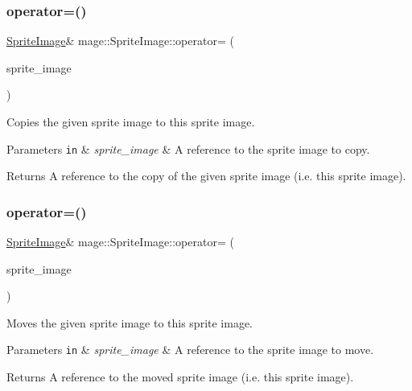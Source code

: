 \subsubsection{\texorpdfstring{operator=()}{operator=()}\hspace{0.1cm}{\footnotesize\ttfamily [1/2]}}
{\footnotesize\ttfamily \hyperlink{classmage_1_1_sprite_image}{Sprite\+Image}\& mage\+::\+Sprite\+Image\+::operator= (\begin{DoxyParamCaption}\item[{const \hyperlink{classmage_1_1_sprite_image}{Sprite\+Image} \&}]{sprite\+\_\+image }\end{DoxyParamCaption})\hspace{0.3cm}{\ttfamily [delete]}}

Copies the given sprite image to this sprite image.


\begin{DoxyParams}[1]{Parameters}
\mbox{\tt in}  & {\em sprite\+\_\+image} & A reference to the sprite image to copy. \\
\hline
\end{DoxyParams}
\begin{DoxyReturn}{Returns}
A reference to the copy of the given sprite image (i.\+e. this sprite image). 
\end{DoxyReturn}
\hypertarget{classmage_1_1_sprite_image_a9f83e728a93550f6b20bb4d500483171}{}\label{classmage_1_1_sprite_image_a9f83e728a93550f6b20bb4d500483171} 
\subsubsection{\texorpdfstring{operator=()}{operator=()}\hspace{0.1cm}{\footnotesize\ttfamily [2/2]}}
{\footnotesize\ttfamily \hyperlink{classmage_1_1_sprite_image}{Sprite\+Image}\& mage\+::\+Sprite\+Image\+::operator= (\begin{DoxyParamCaption}\item[{\hyperlink{classmage_1_1_sprite_image}{Sprite\+Image} \&\&}]{sprite\+\_\+image }\end{DoxyParamCaption})\hspace{0.3cm}{\ttfamily [delete]}}

Moves the given sprite image to this sprite image.


\begin{DoxyParams}[1]{Parameters}
\mbox{\tt in}  & {\em sprite\+\_\+image} & A reference to the sprite image to move. \\
\hline
\end{DoxyParams}
\begin{DoxyReturn}{Returns}
A reference to the moved sprite image (i.\+e. this sprite image). 
\end{DoxyReturn}
\hypertarget{classmage_1_1_sprite_image_a3f4ef2e0a24c2e9deeb6827bf438ae21}{}\label{classmage_1_1_sprite_image_a3f4ef2e0a24c2e9deeb6827bf438ae21} 
